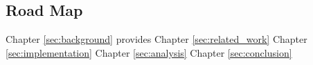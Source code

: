 \subsection{Road Map}

Chapter \ref{sec:background} provides 
Chapter \ref{sec:related_work}
Chapter \ref{sec:implementation}
Chapter \ref{sec:analysis}
Chapter \ref{sec:conclusion}